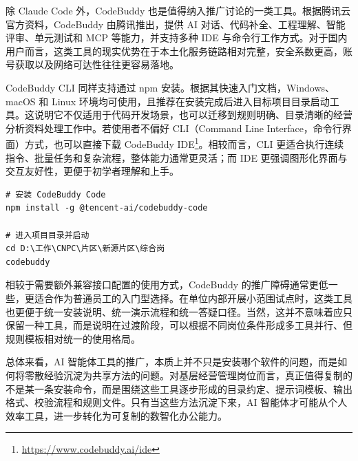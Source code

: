 除 Claude Code 外，CodeBuddy 也是值得纳入推广讨论的一类工具。根据腾讯云官方资料，CodeBuddy 由腾讯推出，提供 AI 对话、代码补全、工程理解、智能评审、单元测试和 MCP 等能力，并支持多种 IDE 与命令行工作方式\cite{codebuddy_product_2026}。对于国内用户而言，这类工具的现实优势在于本土化服务链路相对完整，安全系数更高，账号获取以及网络可达性往往更容易落地。

CodeBuddy CLI 同样支持通过 npm 安装。根据其快速入门文档，Windows、macOS 和 Linux 环境均可使用，且推荐在安装完成后进入目标项目目录启动工具\cite{codebuddy_quickstart_2026}。这说明它不仅适用于代码开发场景，也可以迁移到规则明确、目录清晰的经营分析资料处理工作中。若使用者不偏好 CLI（Command Line Interface，命令行界面）方式，也可以直接下载 CodeBuddy IDE\footnote{\url{https://www.codebuddy.ai/ide}}。相较而言，CLI 更适合执行连续指令、批量任务和复杂流程，整体能力通常更灵活；而 IDE 更强调图形化界面与交互友好性，更便于初学者理解和上手。

\begin{codeexample}[htbp]
   \caption{CodeBuddy 的基础安装与启动示例}
   \begin{lstlisting}[style=cmdview]
# 安装 CodeBuddy Code
npm install -g @tencent-ai/codebuddy-code

# 进入项目目录并启动
cd D:\工作\CNPC\片区\新源片区\综合岗
codebuddy
\end{lstlisting}
\end{codeexample}

相较于需要额外兼容接口配置的使用方式，CodeBuddy 的推广障碍通常更低一些，更适合作为普通员工的入门型选择。在单位内部开展小范围试点时，这类工具也更便于统一安装说明、统一演示流程和统一答疑口径。当然，这并不意味着应只保留一种工具，而是说明在过渡阶段，可以根据不同岗位条件形成多工具并行、但规则模板相对统一的使用格局。

总体来看，AI 智能体工具的推广，本质上并不只是安装哪个软件的问题，而是如何将零散经验沉淀为共享方法的问题。对基层经营管理岗位而言，真正值得复制的不是某一条安装命令，而是围绕这些工具逐步形成的目录约定、提示词模板、输出格式、校验流程和规则文件。只有当这些方法沉淀下来，AI 智能体才可能从个人效率工具，进一步转化为可复制的数智化办公能力。
